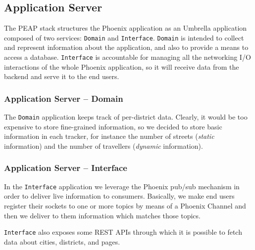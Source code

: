 \subsection{Application Server}\label{sec:sol-des-as}

The PEAP stack structures the Phoenix application as an Umbrella application
composed of two services: \texttt{Domain} and \texttt{Interface}.
\texttt{Domain} is intended to collect and represent information about the
application, and also to provide a means to access a database.
\texttt{Interface} is accountable for managing all the networking I/O
interactions of the whole Phoenix application, so it will receive data from the
backend and serve it to the end users.

\subsubsection{Application Server -- Domain}

The \texttt{Domain} application keeps track of per-district data.
Clearly, it would be too expensive to store fine-grained information, so we
decided to store basic information in each tracker, for instance the number of
streets (\textit{static} information) and the number of travellers
(\textit{dynamic} information).

\subsubsection{Application Server -- Interface}
In the \texttt{Interface} application we leverage the Phoenix pub/sub
mechanism in order to deliver live information to consumers.
Basically, we make end users register their sockets to one or more topics by
means of a Phoenix Channel and then we deliver to them information which
matches those topics.

\texttt{Interface} also exposes some REST APIs through which it is possible to
fetch data about cities, districts, and pages.
